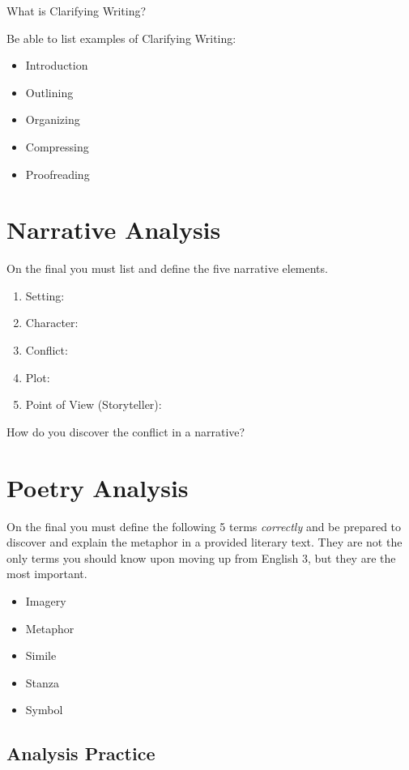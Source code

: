\documentclass[11pt]{article}
\begin{document}
What is Clarifying Writing?
\vspace{2cm}

Be able to list examples of Clarifying Writing:
\begin{itemize}
\item Introduction
\item Outlining
\item Organizing
\item Compressing
\item Proofreading
\end{itemize}

\newpage
\section{Narrative Analysis}
\label{sec:orge1ba52b}

On the final you must list and define the five narrative elements. 
\begin{enumerate}
\item Setting:
\item Character:
\item Conflict:
\item Plot:
\item Point of View (Storyteller):
\end{enumerate}

How do you discover the conflict in a narrative?
\vspace{3cm}

\section{Poetry Analysis}

On the final you must define the following 5 terms \emph{correctly}
and be prepared
to discover and explain the metaphor in a provided literary text.
They are not the only terms you should know upon moving up from
English 3, but they are the most important.

\begin{itemize}
    \item Imagery
    \item Metaphor
    \item Simile
    \item Stanza
    \item Symbol
\end{itemize}

\subsection{Analysis Practice}
\end{document}

